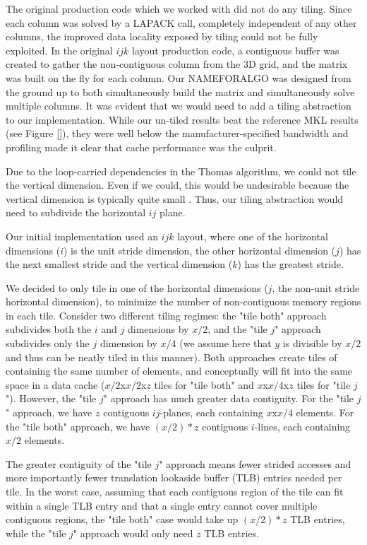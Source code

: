 \documentclass[conference]{IEEEtran}
\begin{document}
The original production code which we worked with did not do any tiling. Since
each column was solved by a LAPACK call, completely independent of any other
columns, the improved data locality exposed by tiling could not be fully
exploited. In the original \(ijk\) layout production code, a contiguous buffer
was created to gather the non-contiguous column from the 3D grid, and the
matrix was built on the fly for each column. Our NAMEFORALGO was designed from
the ground up to both simultaneously build the matrix and simultaneously solve
multiple columns. It was evident that we would need to add a tiling abstraction
to our implementation. While our un-tiled results beat the reference MKL
results (see Figure \ref{}), they were well below the manufacturer-specified
bandwidth and profiling made it clear that cache performance was the culprit.

Due to the loop-carried dependencies in the Thomas algorithm, we could not tile
the vertical dimension. Even if we could, this would be undesirable because the
vertical dimension is typically quite small . Thus, our tiling 
abstraction would need to subdivide the horizontal \(ij\) plane.

Our initial implementation used an \(ijk\) layout, where one of the horizontal
dimensions (\(i\)) is the unit stride dimension, the other horizontal dimension
(\(j\)) has the next smallest stride and the vertical dimension (\(k\)) has the
greatest stride.

We decided to only tile in one of the horizontal dimensions (\(j\), the
non-unit stride horizontal dimension), to minimize the number of non-contiguous
memory regions in each tile. Consider two different tiling regimes: the "tile
both" approach subdivides both the \(i\) and \(j\) dimensions by \(x/2\), and
the "tile \(j\)" approach subdivides only the \(j\) dimension by \(x/4\) (we
assume here that \(y\) is divisible by \(x/2\) and thus can be neatly tiled in
this manner). Both approaches create tiles of containing the same number of
elements, and conceptually will fit into the same space in a data cache
(\(x/2\)x\(x/2\)x\(z\) tiles for "tile both" and \(x\)x\(x/4\)x\(z\) tiles for
"tile \(j\)"). However, the "tile \(j\)" approach has much greater data
contiguity. For the "tile \(j\)" approach, we have \(z\) contiguous
\(ij\)-planes, each containing \(x\)x\(x/4\) elements.  For the "tile both"
approach, we have \((x/2)*z\) contiguous \(i\)-lines, each containing \(x/2\)
elements.

The greater contiguity of the "tile \(j\)" approach means fewer strided
accesses and more importantly fewer translation lookaside buffer (TLB) entries
needed per tile. In the worst case, assuming that each contiguous region of the
tile can fit within a single TLB entry and that a single entry cannot cover
multiple contiguous regions, the "tile both" case would take up \((x/2)*z\) TLB
entries, while the "tile \(j\)" approach would only need \(z\) TLB entries.
\end{document}
